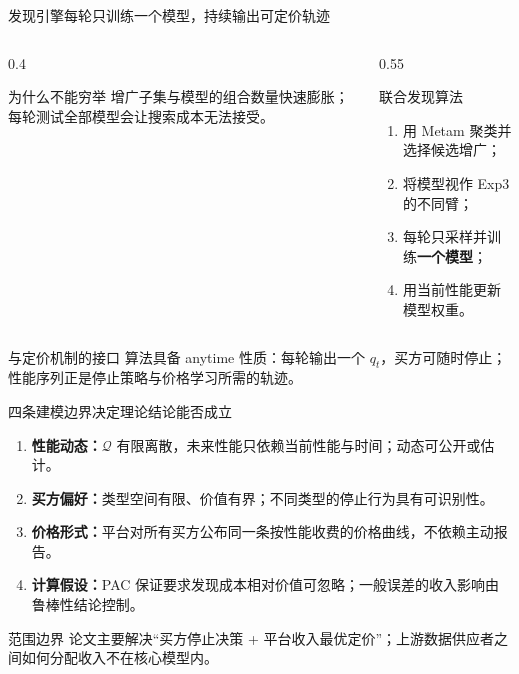 \documentclass[10pt,aspectratio=169]{beamer}
\newcommand{\key}[1]{\textcolor{ZJUBlue}{\textbf{#1}}}
\begin{document}
\begin{frame}{发现引擎每轮只训练一个模型，持续输出可定价轨迹}
  \begin{columns}[T,onlytextwidth]
    \begin{column}{0.4\textwidth}
      \begin{block}{为什么不能穷举}
        增广子集与模型的组合数量快速膨胀；每轮测试全部模型会让搜索成本无法接受。
      \end{block}
    \end{column}
    \begin{column}{0.55\textwidth}
      \begin{alertblock}{联合发现算法}
        \begin{enumerate}
          \item 用 Metam 聚类并选择候选增广；
          \item 将模型视作 Exp3 的不同臂；
          \item 每轮只采样并训练\key{一个模型}；
          \item 用当前性能更新模型权重。
        \end{enumerate}
      \end{alertblock}
    \end{column}
  \end{columns}
  \vspace{0.55em}
  \begin{block}{与定价机制的接口}
    算法具备 anytime 性质：每轮输出一个 $q_t$，买方可随时停止；性能序列正是停止策略与价格学习所需的轨迹。
  \end{block}
\end{frame}

\begin{frame}{四条建模边界决定理论结论能否成立}
  \begin{enumerate}
    \item \key{性能动态：}$\mathcal Q$ 有限离散，未来性能只依赖当前性能与时间；动态可公开或估计。
    \item \key{买方偏好：}类型空间有限、价值有界；不同类型的停止行为具有可识别性。
    \item \key{价格形式：}平台对所有买方公布同一条按性能收费的价格曲线，不依赖主动报告。
    \item \key{计算假设：}PAC 保证要求发现成本相对价值可忽略；一般误差的收入影响由鲁棒性结论控制。
  \end{enumerate}
  \vspace{0.55em}
  \begin{alertblock}{范围边界}
    论文主要解决“买方停止决策 + 平台收入最优定价”；上游数据供应者之间如何分配收入不在核心模型内。
  \end{alertblock}
\end{frame}
\end{document}
